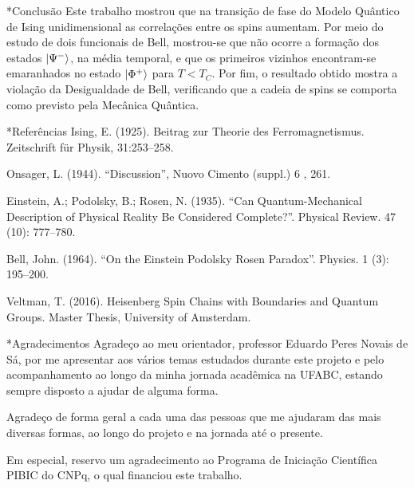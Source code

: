 \documentclass[plainsections, 32pt]{sciposter}
\makeatletter
\newcommand{\largo}{\fontsize{36}{40}\selectfont }
\renewcommand\section{\@startsection {section}{1}{\z@}{-1ex \@plus -0.5ex \@minus -.1ex}{0.8ex \@plus.1ex}{\largo\bfseries\fontsize{28}{26}\selectfont}}
\makeatother
\begin{document}
\begin{multicols}{2}
\vspace{-5mm}

\section*{Conclusão}
\vspace{-2mm}
Este trabalho mostrou que na transição de fase do Modelo Quântico de Ising unidimensional as correlações entre os spins aumentam. Por meio do estudo de dois funcionais de Bell, mostrou-se que não ocorre a formação dos estados $\ket{\Psi^-}$, na média temporal, e que os primeiros vizinhos encontram-se emaranhados no estado $\ket{\Phi^+}$ para $T < T_C$. Por fim, o resultado obtido mostra a violação da Desigualdade de Bell, verificando que a cadeia de spins se comporta como previsto pela Mecânica Quântica.


\section*{Referências}
Ising, E. (1925). Beitrag zur Theorie des Ferromagnetismus. Zeitschrift für Physik, 31:253–258.

Onsager, L. (1944). ``Discussion'', Nuovo Cimento (suppl.) 6 , 261.

Einstein, A.; Podolsky, B.; Rosen, N. (1935). ``Can Quantum-Mechanical Description of Physical Reality Be Considered Complete?''. Physical Review. 47 (10): 777–780.

Bell, John. (1964). ``On the Einstein Podolsky Rosen Paradox''. Physics. 1 (3): 195–200.

Veltman, T. (2016). Heisenberg Spin Chains with
Boundaries and Quantum Groups. Master Thesis, University of Amsterdam.

\section*{Agradecimentos}
Agradeço ao meu orientador, professor Eduardo Peres Novais de Sá, por me apresentar aos vários temas estudados durante este projeto e pelo acompanhamento ao longo da minha jornada acadêmica na UFABC, estando sempre disposto a ajudar de alguma forma.

Agradeço de forma geral a cada uma das pessoas que me ajudaram das mais diversas formas, ao longo do projeto e na jornada até o presente.

Em especial, reservo um agradecimento ao Programa de Iniciação Científica PIBIC do CNPq, o qual financiou este trabalho.

\clearpage %

\end{multicols}
\end{document}
